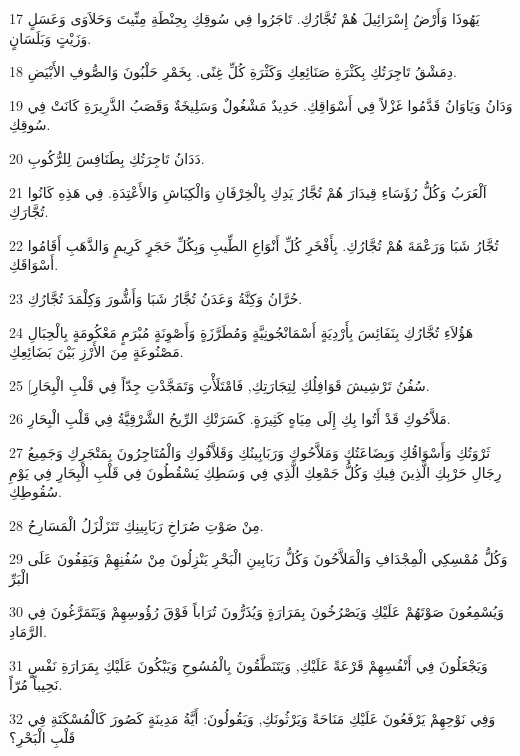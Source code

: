 \par 17 يَهُوذَا وَأَرْضُ إِسْرَائِيلَ هُمْ تُجَّارُكِ. تَاجَرُوا فِي سُوقِكِ بِحِنْطَةِ مِنِّيتَ وَحَلاَوَى وَعَسَلٍ وَزَيْتٍ وَبَلَسَانٍ.
\par 18 دِمَشْقُ تَاجِرَتُكِ بِكَثْرَةِ صَنَائِعِكِ وَكَثْرَةِ كُلِّ غِنًى. بِخَمْرِ حَلْبُونَ وَالصُّوفِ الأَبْيَضِ.
\par 19 وَدَانُ وَيَاوَانُ قَدَّمُوا غَزْلاً فِي أَسْوَاقِكِ. حَدِيدٌ مَشْغُولٌ وَسَلِيخَةٌ وَقَصَبُ الذَّرِيرَةِ كَانَتْ فِي سُوقِكِ.
\par 20 دَدَانُ تَاجِرَتُكِ بِطَنَافِسَ لِلرُّكُوبِ.
\par 21 اَلْعَرَبُ وَكُلُّ رُؤَسَاءِ قِيدَارَ هُمْ تُجَّارُ يَدِكِ بِالْخِرْفَانِ وَالْكِبَاشِ وَالأَعْتِدَةِ. فِي هَذِهِ كَانُوا تُجَّارَكِ.
\par 22 تُجَّارُ شَبَا وَرَعْمَةَ هُمْ تُجَّارُكِ. بِأَفْخَرِ كُلِّ أَنْوَاعِ الطِّيبِ وَبِكُلِّ حَجَرٍ كَرِيمٍ وَالذَّهَبِ أَقَامُوا أَسْوَاقَكِ.
\par 23 حُرَّانُ وَكِنَّةُ وَعَدَنُ تُجَّارُ شَبَا وَأَشُّورَ وَكِلْمَدَ تُجَّارُكِ.
\par 24 هَؤُلاَءِ تُجَّارُكِ بِنَفَائِسَ بِأَرْدِيَةٍ أَسْمَانْجُونِيَّةٍ وَمُطَرَّزَةٍ وَأَصْوِنَةٍ مُبْرَمٍ مَعْكُومَةٍ بِالْحِبَالِ مَصْنُوعَةٍ مِنَ الأَرْزِ بَيْنَ بَضَائِعِكِ.
\par 25 [سُفُنُ تَرْشِيشَ قَوَافِلُكِ لِتِجَارَتِكِ, فَامْتَلَأْتِ وَتَمَجَّدْتِ جِدّاً فِي قَلْبِ الْبِحَارِ.
\par 26 مَلاَّحُوكِ قَدْ أَتُوا بِكِ إِلَى مِيَاهٍ كَثِيرَةٍ. كَسَرَتْكِ الرِّيحُ الشَّرْقِيَّةُ فِي قَلْبِ الْبِحَارِ.
\par 27 ثَرْوَتُكِ وَأَسْوَاقُكِ وَبِضَاعَتُكِ وَمَلاَّحُوكِ وَرَبَابِينُكِ وَقَلاَّفُوكِ وَالْمُتَاجِرُونَ بِمَتْجَرِكِ وَجَمِيعُ رِجَالِ حَرْبِكِ الَّذِينَ فِيكِ وَكُلُّ جَمْعِكِ الَّذِي فِي وَسَطِكِ يَسْقُطُونَ فِي قَلْبِ الْبِحَارِ فِي يَوْمِ سُقُوطِكِ.
\par 28 مِنْ صَوْتِ صُرَاخِ رَبَابِينِكِ تَتَزَلْزَلُ الْمَسَارِحُ.
\par 29 وَكُلُّ مُمْسِكِي الْمِجْدَافِ وَالْمَلاَّحُونَ وَكُلُّ رَبَابِينِ الْبَحْرِ يَنْزِلُونَ مِنْ سُفُنِهِمْ وَيَقِفُونَ عَلَى الْبَرِّ
\par 30 وَيُسْمِعُونَ صَوْتَهُمْ عَلَيْكِ وَيَصْرُخُونَ بِمَرَارَةٍ وَيُذَرُّونَ تُرَاباً فَوْقَ رُؤُوسِهِمْ وَيَتَمَرَّغُونَ فِي الرَّمَادِ.
\par 31 وَيَجْعَلُونَ فِي أَنْفُسِهِمْ قَرْعَةً عَلَيْكِ, وَيَتَنَطَّقُونَ بِالْمُسُوحِ وَيَبْكُونَ عَلَيْكِ بِمَرَارَةِ نَفْسٍ نَحِيباً مُرّاً.
\par 32 وَفِي نَوْحِهِمْ يَرْفَعُونَ عَلَيْكِ مَنَاحَةً وَيَرْثُونَكِ, وَيَقُولُونَ: أَيَّةُ مَدِينَةٍ كَصُورَ كَالْمُسْكَتَةِ فِي قَلْبِ الْبَحْرِ؟
